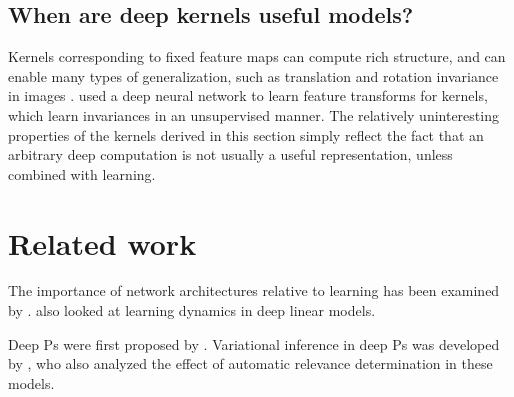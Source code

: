 \documentclass[twoside]{article}
\makeatletter
\newlength{\nonHumbleHeight}
\def\@humbleformat#1{{\settoheight{\nonHumbleHeight}{#1}\resizebox{!}{0.94\nonHumbleHeight}{#1}}}%
\def\humble#1{\@humbleformat{#1}}%
\newcommand{\gp}{{\humble GP}}
\newcommand{\sectiondist}{}
\makeatother
\begin{document}
\subsection{When are deep kernels useful models?}
\sectiondist


Kernels corresponding to fixed feature maps can compute %
rich structure, and can enable many types of generalization, such as translation and rotation invariance in images \citep{kondor2008group}.
\cite{SalHin08} used a deep neural network to learn feature transforms for kernels, which learn invariances in an unsupervised manner.
%
The relatively uninteresting properties of the kernels derived in this section simply reflect the fact that an arbitrary deep computation is not usually a useful representation, unless combined with learning.






\section{Related work}
\sectiondist

The importance of network architectures relative to learning has been examined by \cite{saxe2011random}.  \cite{saxedynamics} also looked at learning dynamics in deep linear models.


Deep \gp{}s were first proposed by \cite{lawrence2007hierarchical}. Variational inference in deep \gp{}s was developed by \cite{damianou2012deep}, who also analyzed the effect of automatic relevance determination in these models.
%
%
\end{document}
